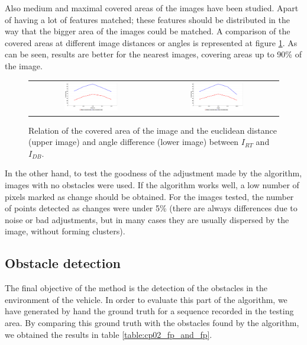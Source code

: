Also medium and maximal covered areas of the images have been studied. Apart of having a lot of features matched; these features should be distributed in the way that the bigger area of the images could be matched. A comparison of the covered areas at different image distances or angles is represented at figure \ref{fig:cp02_area_covered}. As can be seen, results are better for the nearest images, covering areas up to 90\% of the image.

\begin{figure}[h!]
\centering
\begin{tabular}{cc}
\includegraphics[width=0.45\textwidth]{distance_vs_area}\label{fig:cp02_distance_vs_area} &
\includegraphics[width=0.45\textwidth]{angle_vs_area}\label{fig:cp02_angle_vs_area}
\end{tabular}
\caption{Relation of the covered area of the image and the euclidean distance (upper image) and angle difference (lower image) between $I_{RT}$ and $I_{DB}$.}\label{fig:cp02_area_covered}
\end{figure}

In the other hand, to test the goodness of the adjustment made by the algorithm, images with no obstacles were used. If the algorithm works well, a low number of pixels marked as change should be obtained. For the images tested, the number of points detected as changes were under 5\% (there are always differences due to noise or bad adjustments, but in many cases they are usually dispersed by the image, without forming clusters).

\subsection{Obstacle detection}\label{ch:chapter02_02_02}

The final objective of the method is the detection of the obstacles in the environment of the vehicle. In order to evaluate this part of the algorithm, we have generated by hand the ground truth for a sequence recorded in the testing area. By comparing this ground truth with the obstacles found by the algorithm, we obtained the results in table \ref{table:cp02_fp_and_fp}.

